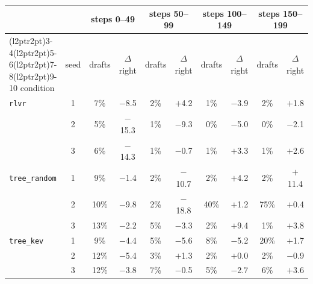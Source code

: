 \begin{tabular}{@{}lccccccccc@{}}
\toprule
 & & \multicolumn{2}{c}{steps 0--49} & \multicolumn{2}{c}{steps 50--99} & \multicolumn{2}{c}{steps 100--149} & \multicolumn{2}{c}{steps 150--199} \\ \cmidrule(l{2pt}r{2pt}){3-4}\cmidrule(l{2pt}r{2pt}){5-6}\cmidrule(l{2pt}r{2pt}){7-8}\cmidrule(l{2pt}r{2pt}){9-10}
condition & seed & drafts & $\Delta$ right & drafts & $\Delta$ right & drafts & $\Delta$ right & drafts & $\Delta$ right \\ \midrule
\texttt{rlvr} & 1 & 7\% & $-$8.5 & 2\% & $+$4.2 & 1\% & $-$3.9 & 2\% & $+$1.8 \\
 & 2 & 5\% & $-$15.3 & 1\% & $-$9.3 & 0\% & $-$5.0 & 0\% & $-$2.1 \\
 & 3 & 6\% & $-$14.3 & 1\% & $-$0.7 & 1\% & $+$3.3 & 1\% & $+$2.6 \\
\addlinespace
\texttt{tree\_random} & 1 & 9\% & $-$1.4 & 2\% & $-$10.7 & 2\% & $+$4.2 & 2\% & $+$11.4 \\
 & 2 & 10\% & $-$9.8 & 2\% & $-$18.8 & 40\% & $+$1.2 & 75\% & $+$0.4 \\
 & 3 & 13\% & $-$2.2 & 5\% & $-$3.3 & 2\% & $+$9.4 & 1\% & $+$3.8 \\
\addlinespace
\texttt{tree\_kev} & 1 & 9\% & $-$4.4 & 5\% & $-$5.6 & 8\% & $-$5.2 & 20\% & $+$1.7 \\
 & 2 & 12\% & $-$5.4 & 3\% & $+$1.3 & 2\% & $+$0.0 & 2\% & $-$0.9 \\
 & 3 & 12\% & $-$3.8 & 7\% & $-$0.5 & 5\% & $-$2.7 & 6\% & $+$3.6 \\
\bottomrule
\end{tabular}
